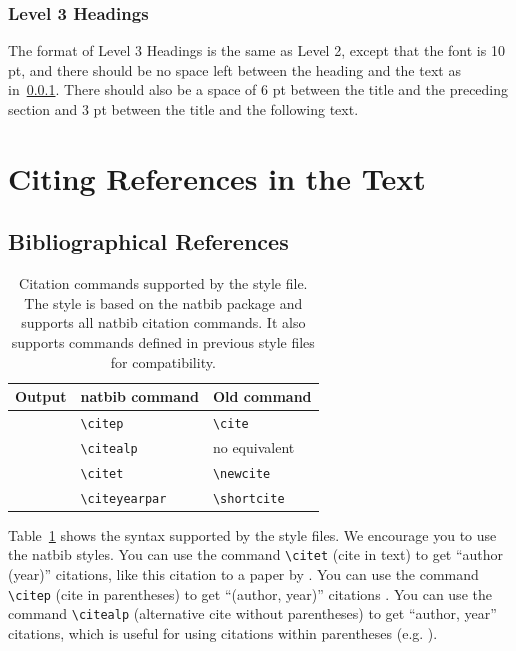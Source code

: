 \documentclass[10pt, a4paper]{article}
\begin{document}
\subsubsection{Level 3 Headings}
\label{level3H}

The format of Level 3 Headings is the same as Level 2, except that the font is  10 pt, and there should be no space left between the heading and the text as in~\ref{level3H}. There should also be a space of 6 pt between the title and the preceding section and 3 pt between the title and the following text.

\section{Citing References in the Text}

\subsection{Bibliographical References}


\begin{table}
\centering
\begin{tabular}{lll}
\hline
\textbf{Output} & \textbf{natbib command} & \textbf{Old command}\\
\hline
\citep{Eco:1990} & \verb|\citep| & \verb|\cite| \\
\citealp{Eco:1990} & \verb|\citealp| & no equivalent \\
\citet{Eco:1990} & \verb|\citet| & \verb|\newcite| \\
\citeyearpar{Eco:1990} & \verb|\citeyearpar| & \verb|\shortcite| \\
\hline
\end{tabular}
\caption{\label{citation-guide} Citation commands supported by the style file. The style is based on the natbib package and supports all natbib citation commands. It also supports commands defined in previous style files for compatibility.}
\end{table}

Table~\ref{citation-guide} shows the syntax supported by the style files. We encourage you to use the natbib styles.
You can use the command \verb|\citet| (cite in text) to get ``author (year)'' citations, like this citation to a paper by \citet{CastorPollux-92}. You can use the command \verb|\citep| (cite in parentheses) to get ``(author, year)'' citations \citep{CastorPollux-92}. You can use the command \verb|\citealp| (alternative cite without parentheses) to get ``author, year'' citations, which is useful for using citations within parentheses (e.g. \citealp{CastorPollux-92}).
\end{document}
